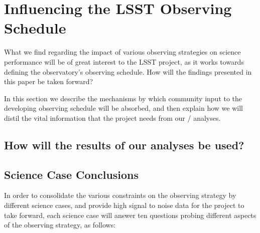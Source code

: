 
\section{Influencing the LSST Observing Schedule}
\label{sec:\secname:schedule}

What we find regarding the impact of various observing strategies on
science performance will be of great interest to the LSST project, as it
works towards defining the observatory's observing schedule. How will
the findings presented in this paper be taken forward?

In this section we describe the mechanisms by which community input to
the developing observing schedule will be absorbed, and then explain how
we will distil the vital information that the project needs from our
\OpSim / \MAF analyses.


\subsection{How will the results of our analyses be used?}
\label{sec:\secname:useage}



\subsection{Science Case Conclusions}
\label{sec:\secname:caseConclusions}

In order to consolidate the various constraints on the observing
strategy by different science cases, and provide high signal to noise
data for the project to take forward, each science case will answer ten
questions probing different aspects of the observing strategy, as
follows:

